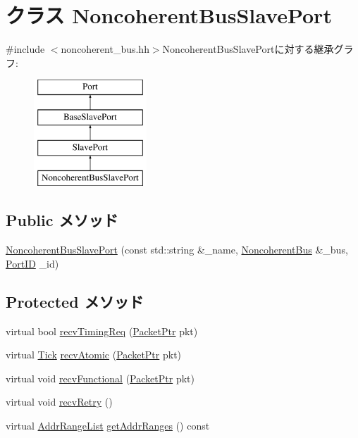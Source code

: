 \hypertarget{classNoncoherentBus_1_1NoncoherentBusSlavePort}{
\section{クラス NoncoherentBusSlavePort}
\label{classNoncoherentBus_1_1NoncoherentBusSlavePort}
}


{\ttfamily \#include $<$noncoherent\_\-bus.hh$>$}NoncoherentBusSlavePortに対する継承グラフ:\begin{figure}[H]
\begin{center}
\leavevmode
\includegraphics[height=4cm]{classNoncoherentBus_1_1NoncoherentBusSlavePort}
\end{center}
\end{figure}
\subsection*{Public メソッド}
\begin{DoxyCompactItemize}
\item 
\hyperlink{classNoncoherentBus_1_1NoncoherentBusSlavePort_aeea60f0b9850ceae5faa8726f2d4d19a}{NoncoherentBusSlavePort} (const std::string \&\_\-name, \hyperlink{classNoncoherentBus}{NoncoherentBus} \&\_\-bus, \hyperlink{base_2types_8hh_acef4d7d41cb21fdc252e20c04cd7bb8e}{PortID} \_\-id)
\end{DoxyCompactItemize}
\subsection*{Protected メソッド}
\begin{DoxyCompactItemize}
\item 
virtual bool \hyperlink{classNoncoherentBus_1_1NoncoherentBusSlavePort_ad3786e65574e70ec0a5bd2b0ce311d20}{recvTimingReq} (\hyperlink{classPacket}{PacketPtr} pkt)
\item 
virtual \hyperlink{base_2types_8hh_a5c8ed81b7d238c9083e1037ba6d61643}{Tick} \hyperlink{classNoncoherentBus_1_1NoncoherentBusSlavePort_a9b5348b3521da3a6333e6b0eed3b98e6}{recvAtomic} (\hyperlink{classPacket}{PacketPtr} pkt)
\item 
virtual void \hyperlink{classNoncoherentBus_1_1NoncoherentBusSlavePort_a914924599c231593833dd1d527b4bb7c}{recvFunctional} (\hyperlink{classPacket}{PacketPtr} pkt)
\item 
virtual void \hyperlink{classNoncoherentBus_1_1NoncoherentBusSlavePort_a7ec461ad187b82b4b21e27c86e45cf9c}{recvRetry} ()
\item 
virtual \hyperlink{classstd_1_1list}{AddrRangeList} \hyperlink{classNoncoherentBus_1_1NoncoherentBusSlavePort_a9367d737cb872cb8573f44b501f99363}{getAddrRanges} () const 
\end{DoxyCompactItemize}
